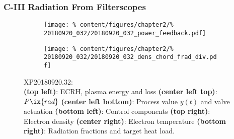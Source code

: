             \subsubsection*{C-III Radiation From Filterscopes}
%
                \begin{figure}[t]%
                    \centering%
                    \begin{subfigure}{.48\textwidth}%
                        \centering%
                        \texttt{[image: \%
                            content/figures/chapter2/\%
                            20180920\_032/20180920\_032\_power\_feedback.pdf]}%
                    \end{subfigure}%
                    \hfill%
                    \begin{subfigure}{.48\textwidth}%
                        \centering%
                        \texttt{[image: \%
                            content/figures/chapter2/\%
                            20180920\_032/20180920\_032\_dens\_chord\_frad\_div.pdf]}%
                    \end{subfigure}%
                    \caption{%
                        XP20180920.32:\\%
                        \textbf{(top left)}: ECRH, plasma energy and loss \textbf{(center left top)}: $P\ix{rad}$ \textbf{(center left bottom)}: Process value $y\left(t\right)$ and valve actuation \textbf{(bottom left)}: Control components \textbf{(top right)}: Electron density \textbf{(center right)}: Electron temperature \textbf{(bottom right)}: Radiation fractions and target heat load.}\label{fig:20180920.32_PDF}%
                \end{figure}%
%
